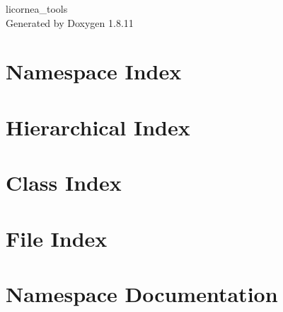 \documentclass[twoside]{book}
\newcommand{\+}{\discretionary{\mbox{\scriptsize$\hookleftarrow$}}{}{}}
\newcommand{\clearemptydoublepage}{%
  \newpage{\pagestyle{empty}\cleardoublepage}%
}
\begin{document}
\hypersetup{pageanchor=false,
             bookmarksnumbered=true,
             pdfencoding=unicode
            }
\begin{titlepage}
\vspace*{7cm}
\begin{center}%
{\Large licornea\+\_\+tools }\\
\vspace*{1cm}
{\large Generated by Doxygen 1.8.11}\\
\end{center}
\end{titlepage}
\clearemptydoublepage
\tableofcontents
\clearemptydoublepage
{}
\hypersetup{pageanchor=true}

\chapter{Namespace Index}

\chapter{Hierarchical Index}

\chapter{Class Index}

\chapter{File Index}

\chapter{Namespace Documentation}























\end{document}
